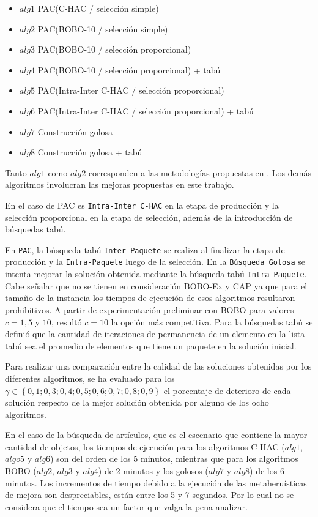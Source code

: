 \begin{itemize}
\item{$alg1$} PAC(C-HAC / selección simple)
\item{$alg2$} PAC(BOBO-10 / selección simple)
\item{$alg3$} PAC(BOBO-10 / selección proporcional)
\item{$alg4$} PAC(BOBO-10 / selección proporcional) + tabú
\item{$alg5$} PAC(Intra-Inter C-HAC / selección proporcional)
\item{$alg6$} PAC(Intra-Inter C-HAC / selección proporcional) + tabú
\item{$alg7$} Construcción golosa
\item{$alg8$} Construcción golosa + tabú
\end{itemize}

Tanto $alg1$ como $alg2$ corresponden a las metodologías propuestas en \cite{compositeRetrival}. Los demás algoritmos involucran las mejoras propuestas en este trabajo. 

En el caso de PAC es \texttt{Intra-Inter C-HAC} en la etapa de producción y la selección proporcional en la etapa de selección, además de la introducción de búsquedas tabú. 

En \texttt{PAC}, la búsqueda tabú \texttt{Inter-Paquete} se realiza al finalizar la etapa de producción y la \texttt{Intra-Paquete} luego de la selección. En la \texttt{Búsqueda Golosa} se intenta mejorar la solución obtenida mediante la búsqueda tabú \texttt{Intra-Paquete}. Cabe señalar que no se tienen en consideración BOBO-Ex y CAP ya que para el tamaño de la instancia los tiempos de ejecución de esos algoritmos resultaron prohibitivos. A partir de experimentación preliminar con BOBO para valores $c=1, 5$ y $10$, resultó $c=10$ la opción más competitiva. Para la búsquedas tabú se definió que la cantidad de iteraciones de permanencia de un elemento en la lista tabú sea el promedio de elementos que tiene un paquete en la solución inicial.

Para realizar una comparación entre la calidad de las soluciones obtenidas por los diferentes algoritmos, se ha evaluado para los $\gamma \in \left\{0,1; 0,3; 0,4; 0,5; 0,6; 0,7; 0,8; 0,9\right\}$ el porcentaje de deterioro de cada solución respecto de la mejor solución obtenida por alguno de los ocho algoritmos.

En el caso de la búsqueda de artículos, que es el escenario que contiene la mayor cantidad de objetos, los tiempos de ejecución  para los algoritmos C-HAC ($alg1$, $algo5$ y $alg6$) son del orden de los 5 minutos, mientras que para los algoritmos BOBO ($alg2$, $alg3$ y $alg4$) de 2 minutos y los golosos ($alg7$ y $alg8$) de los 6 minutos. Los incrementos de tiempo debido a la ejecución de las metaheruísticas de mejora son despreciables, están entre los 5 y 7 segundos. Por lo cual no se considera que el tiempo sea un factor que valga la pena analizar.

